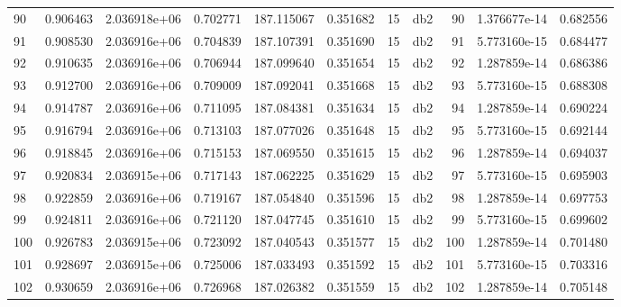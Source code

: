 \begin{tabular}{lrrrrrrlrrr}
90   &    0.906463 &        2.036918e+06 &  0.702771 &              187.115067 &    0.351682 &      15 &          db2 &     90 &   1.376677e-14 &      0.682556 \\
91   &    0.908530 &        2.036916e+06 &  0.704839 &              187.107391 &    0.351690 &      15 &          db2 &     91 &   5.773160e-15 &      0.684477 \\
92   &    0.910635 &        2.036916e+06 &  0.706944 &              187.099640 &    0.351654 &      15 &          db2 &     92 &   1.287859e-14 &      0.686386 \\
93   &    0.912700 &        2.036916e+06 &  0.709009 &              187.092041 &    0.351668 &      15 &          db2 &     93 &   5.773160e-15 &      0.688308 \\
94   &    0.914787 &        2.036916e+06 &  0.711095 &              187.084381 &    0.351634 &      15 &          db2 &     94 &   1.287859e-14 &      0.690224 \\
95   &    0.916794 &        2.036916e+06 &  0.713103 &              187.077026 &    0.351648 &      15 &          db2 &     95 &   5.773160e-15 &      0.692144 \\
96   &    0.918845 &        2.036916e+06 &  0.715153 &              187.069550 &    0.351615 &      15 &          db2 &     96 &   1.287859e-14 &      0.694037 \\
97   &    0.920834 &        2.036915e+06 &  0.717143 &              187.062225 &    0.351629 &      15 &          db2 &     97 &   5.773160e-15 &      0.695903 \\
98   &    0.922859 &        2.036916e+06 &  0.719167 &              187.054840 &    0.351596 &      15 &          db2 &     98 &   1.287859e-14 &      0.697753 \\
99   &    0.924811 &        2.036916e+06 &  0.721120 &              187.047745 &    0.351610 &      15 &          db2 &     99 &   5.773160e-15 &      0.699602 \\
100  &    0.926783 &        2.036915e+06 &  0.723092 &              187.040543 &    0.351577 &      15 &          db2 &    100 &   1.287859e-14 &      0.701480 \\
101  &    0.928697 &        2.036915e+06 &  0.725006 &              187.033493 &    0.351592 &      15 &          db2 &    101 &   5.773160e-15 &      0.703316 \\
102  &    0.930659 &        2.036916e+06 &  0.726968 &              187.026382 &    0.351559 &      15 &          db2 &    102 &   1.287859e-14 &      0.705148 \\

\end{tabular}
